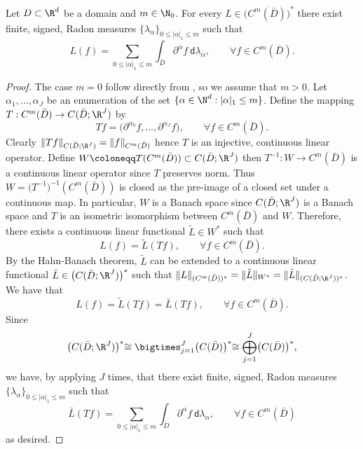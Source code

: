 \begin{lemma}
\label{lemma:reisz}
Let \(D \subset \R^d\) be a domain and \(m \in \N_0\). For every \(L \in \bigl (C^m (\bar{D}) \bigl )^*\) 
there exist finite, signed, Radon measures \(\{\lambda_\alpha\}_{0 \leq |\alpha|_1 \leq m}\) such that
\[L(f) = \sum_{0 \leq |\alpha|_1 \leq m} \int_{\bar{D}} \partial^\alpha f \: \mathsf{d}\lambda_\alpha, \qquad \forall f \in C^m(\bar{D}).\] 
\end{lemma}
\begin{proof}
The case \(m = 0\) follow directly from \cite[Theorem B.111]{leoni2009first}, so we assume that \(m > 0\).
Let \(\alpha_1,\dots,\alpha_J\) be an enumeration of the set \(\{\alpha \in \N^d : |\alpha|_1 \leq m\}\).
Define the mapping \(T : C^m(\bar{D}) \to C(\bar{D};\R^J)\) by
\[Tf = \bigl ( \partial^{\alpha_0} f, \dots, \partial^{\alpha_J}f ), \qquad \forall f \in C^m(\bar{D}).\]
Clearly \(\|Tf\|_{C(\bar{D};\R^J)} = \|f\|_{C^m(\bar{D})}\) hence \(T\) is an injective, continuous linear operator.
Define \(W \coloneqq T(C^m(\bar{D})) \subset C(\bar{D};\R^J)\) then \(T^{-1} : W \to C^m (\bar{D})\) is a continuous linear 
operator since \(T\) preserves norm. Thus \(W = \bigl (T^{-1} \bigl)^{-1}(C^m(\bar{D}))\) is closed as the pre-image of a 
closed set under a continuous map. In particular, \(W\) is a Banach space since \(C(\bar{D};\R^J)\) is a Banach space
and \(T\) is an isometric isomorphism between \(C^m(\bar{D})\) and \(W\). Therefore, there exists a 
continuous linear functional \(\tilde{L} \in W^*\) such that 
\[L(f) = \tilde{L}(Tf), \qquad \forall f \in C^m (\bar{D}).\]
By the Hahn-Banach theorem, \(\tilde{L}\) can be extended to a continuous linear functional \(\bar{L} \in \bigl ( C(\bar{D};\R^J) \bigl)^*\)
such that \(\|L\|_{(C^m(\bar{D}))^*} = \|\tilde{L}\|_{W^*} = \|\bar{L}\|_{(C(\bar{D};\R^J))^*}\). We have that
\[L(f) = \tilde{L}(Tf) = \bar{L}(Tf), \qquad \forall f \in C^m (\bar{D}).\]
Since 
\[\bigl ( C(\bar{D};\R^J) \bigl )^* \cong \bigtimes_{j=1}^J \bigl ( C(\bar{D}) \bigl )^* \cong \bigoplus_{j=1}^J \bigl ( C(\bar{D}) \bigl )^*,\]
we have, by applying \cite[Theorem B.111]{leoni2009first} \(J\) times, that there exist finite, signed, Radon measures \(\{\lambda_\alpha\}_{0 \leq |\alpha|_1 \leq m}\) 
such that
\[\bar{L}(Tf) = \sum_{0 \leq |\alpha|_1 \leq m} \int_{\bar{D}} \partial^\alpha f \: \mathsf{d}\lambda_\alpha, \qquad \forall f \in C^m(\bar{D})\]
as desired.
\end{proof}



